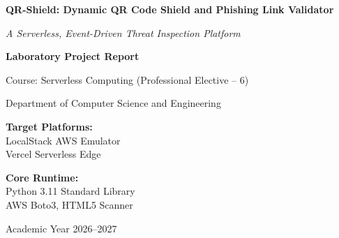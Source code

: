 \documentclass[12pt,a4paper]{report}
\begin{document}
\begin{titlepage}
    \centering
    \vspace*{1.5cm}
    
    {\huge\bfseries QR-Shield: Dynamic QR Code Shield and Phishing Link Validator\par}
    \vspace{1cm}
    {\Large\itshape A Serverless, Event-Driven Threat Inspection Platform\par}
    
    \vspace{2.5cm}
    
    \textbf{\Large Laboratory Project Report}\par
    \vspace{0.5cm}
    \textsf{Course: Serverless Computing (Professional Elective -- 6)}\par
    \textsf{Department of Computer Science and Engineering}\par
    
    \vfill
    
    \begin{minipage}{0.48\textwidth}
        \begin{flushleft}
            \large
            \textbf{Target Platforms:}\\
            LocalStack AWS Emulator\\
            Vercel Serverless Edge
        \end{flushleft}
    \end{minipage}
    \hfill
    \begin{minipage}{0.48\textwidth}
        \begin{flushright}
            \large
            \textbf{Core Runtime:}\\
            Python 3.11 Standard Library\\
            AWS Boto3, HTML5 Scanner
        \end{flushright}
    \end{minipage}

    \vspace{1.5cm}
    {\large Academic Year 2026--2027\par}
\end{titlepage}

\tableofcontents
\newpage
\end{document}
